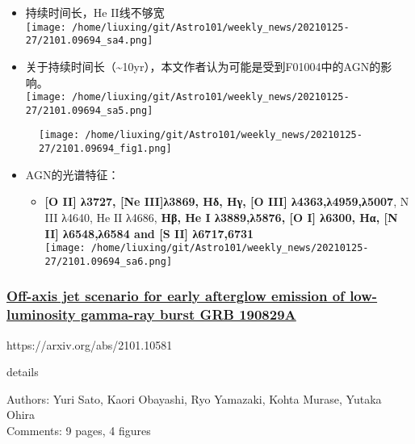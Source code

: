 \documentclass[
]{article}
\begin{document}
\begin{itemize}
  \begin{itemize}
  \item
    持续时间长，He II线不够宽\\
    \texttt{[image: /home/liuxing/git/Astro101/weekly\_news/20210125-27/2101.09694\_sa4.png]}
  \item
    关于持续时间长（\textasciitilde10yr），本文作者认为可能是受到F01004中的AGN的影响。\\
    \texttt{[image: /home/liuxing/git/Astro101/weekly\_news/20210125-27/2101.09694\_sa5.png]}
  \end{itemize}
\end{itemize}

\begin{figure}
\centering
\texttt{[image: /home/liuxing/git/Astro101/weekly\_news/20210125-27/2101.09694\_fig1.png]}
\caption{}
\end{figure}

\begin{itemize}
\item
  AGN的光谱特征：

  \begin{itemize}
  \item
    \textbf{{[}O II{]} λ3727, {[}Ne III{]}λ3869, Hδ, Hγ, {[}O III{]}
    λ4363,λ4959,λ5007}, N III λ4640, He II λ4686, \textbf{Hβ, He I
    λ3889,λ5876, {[}O I{]} λ6300, Hα, {[}N II{]} λ6548,λ6584 and {[}S
    II{]} λ6717,6731}\\
    \texttt{[image: /home/liuxing/git/Astro101/weekly\_news/20210125-27/2101.09694\_sa6.png]}
  \end{itemize}
\end{itemize}

\hypertarget{header-n69}{%
\subsubsection{\texorpdfstring{\href{./2101.10581.pdf}{Off-axis jet
scenario for early afterglow emission of low-luminosity gamma-ray burst
GRB
190829A}}{Off-axis jet scenario for early afterglow emission of low-luminosity gamma-ray burst GRB 190829A}}\label{header-n69}}

https://arxiv.org/abs/2101.10581

details

Authors: Yuri Sato, Kaori Obayashi, Ryo Yamazaki, Kohta Murase, Yutaka
Ohira\\
Comments: 9 pages, 4 figures
\end{document}
